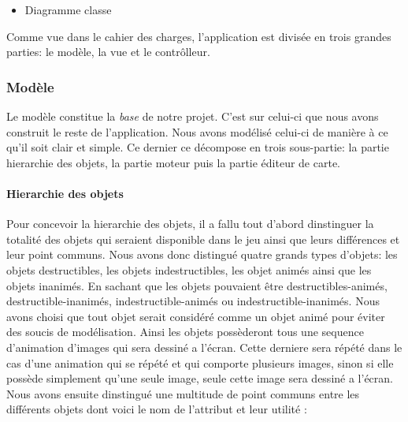 	\begin{itemize}
		\item{Diagramme classe}
	\end{itemize}
	
	Comme vue dans le cahier des charges, l'application est divisée en trois grandes parties: le modèle, la vue et le contrôlleur.
	
	\subsubsection{Modèle}
	
	Le modèle constitue la \textit{base} de notre projet. C'est sur celui-ci que nous avons construit le reste de l'application. Nous avons modélisé celui-ci de manière à ce qu'il soit clair et simple. Ce dernier ce décompose en trois sous-partie: la partie hierarchie des objets, la partie moteur puis la partie éditeur de carte.\\
	
	\paragraph{Hierarchie des objets \\}
	
	Pour concevoir la hierarchie des objets, il a fallu tout d'abord dinstinguer la totalité des objets qui seraient disponible dans le jeu ainsi que leurs différences et leur point communs.  Nous avons donc distingué quatre grands types d'objets: les objets destructibles, les objets indestructibles, les objet animés ainsi que les objets inanimés. En sachant que les objets pouvaient être destructibles-animés, destructible-inanimés, indestructible-animés ou indestructible-inanimés. Nous avons choisi que tout objet serait considéré comme un objet animé pour éviter des soucis de modélisation. Ainsi les objets possèderont tous une sequence d'animation d'images qui sera dessiné a l'écran. Cette derniere sera répété dans le cas d'une animation qui se répété et qui comporte plusieurs images, sinon si elle possède simplement qu'une seule image, seule cette image sera dessiné a l'écran. Nous avons ensuite dinstingué une multitude de point communs entre les différents objets dont voici le nom de l'attribut et leur utilité : 
	
